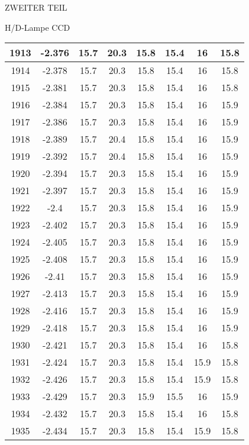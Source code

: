 \begin{appendix}
\begin{chapter}{ZWEITER TEIL}
\begin{section}{H/D-Lampe CCD}
\begin{scriptsize}
\begin{longtable}[htbp]{|c|c|c|c|c|c|c|c|}
            1913 & -2.376 & 15.7 & 20.3 & 15.8 & 15.4 & 16 & 15.8 \\ \hline
            1914 & -2.378 & 15.7 & 20.3 & 15.8 & 15.4 & 16 & 15.8 \\ \hline
            1915 & -2.381 & 15.7 & 20.3 & 15.8 & 15.4 & 16 & 15.8 \\ \hline
            1916 & -2.384 & 15.7 & 20.3 & 15.8 & 15.4 & 16 & 15.9 \\ \hline
            1917 & -2.386 & 15.7 & 20.3 & 15.8 & 15.4 & 16 & 15.9 \\ \hline
            1918 & -2.389 & 15.7 & 20.4 & 15.8 & 15.4 & 16 & 15.9 \\ \hline
            1919 & -2.392 & 15.7 & 20.4 & 15.8 & 15.4 & 16 & 15.9 \\ \hline
            1920 & -2.394 & 15.7 & 20.3 & 15.8 & 15.4 & 16 & 15.9 \\ \hline
            1921 & -2.397 & 15.7 & 20.3 & 15.8 & 15.4 & 16 & 15.9 \\ \hline
            1922 & -2.4 & 15.7 & 20.3 & 15.8 & 15.4 & 16 & 15.9 \\ \hline
            1923 & -2.402 & 15.7 & 20.3 & 15.8 & 15.4 & 16 & 15.9 \\ \hline
            1924 & -2.405 & 15.7 & 20.3 & 15.8 & 15.4 & 16 & 15.9 \\ \hline
            1925 & -2.408 & 15.7 & 20.3 & 15.8 & 15.4 & 16 & 15.9 \\ \hline
            1926 & -2.41 & 15.7 & 20.3 & 15.8 & 15.4 & 16 & 15.9 \\ \hline
            1927 & -2.413 & 15.7 & 20.3 & 15.8 & 15.4 & 16 & 15.9 \\ \hline
            1928 & -2.416 & 15.7 & 20.3 & 15.8 & 15.4 & 16 & 15.9 \\ \hline
            1929 & -2.418 & 15.7 & 20.3 & 15.8 & 15.4 & 16 & 15.9 \\ \hline
            1930 & -2.421 & 15.7 & 20.3 & 15.8 & 15.4 & 16 & 15.8 \\ \hline
            1931 & -2.424 & 15.7 & 20.3 & 15.8 & 15.4 & 15.9 & 15.8 \\ \hline
            1932 & -2.426 & 15.7 & 20.3 & 15.8 & 15.4 & 15.9 & 15.8 \\ \hline
            1933 & -2.429 & 15.7 & 20.3 & 15.9 & 15.5 & 16 & 15.9 \\ \hline
            1934 & -2.432 & 15.7 & 20.3 & 15.8 & 15.4 & 16 & 15.8 \\ \hline
            1935 & -2.434 & 15.7 & 20.3 & 15.8 & 15.4 & 15.9 & 15.8 \\ \hline

\end{longtable}
\end{scriptsize}
\end{section}
\end{chapter}
\end{appendix}
